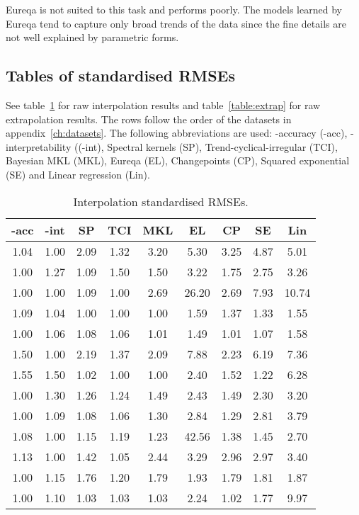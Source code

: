 Eureqa is not suited to this task and performs poorly.
The models learned by Eureqa tend to capture only broad trends of the data since the fine details are not well explained by parametric forms.

\subsection{Tables of standardised RMSEs}

See table~\ref{table:interp} for raw interpolation results and table~\ref{table:extrap} for raw extrapolation results. 
The rows follow the order of the datasets in appendix~\ref{ch:datasets}.
The following abbreviations are used: \procedurename{}-accuracy (\procedurename{}-acc), \procedurename{}-interpretability ((\procedurename{}-int), Spectral kernels (SP), Trend-cyclical-irregular (TCI), Bayesian MKL (MKL), Eureqa (EL), Changepoints (CP), Squared exponential (SE) and Linear regression (Lin).

\begin{table}[ht]
\center
\begin{tabular}{|c|c|c|c|c|c|c|c|c|}
\hline
\procedurename{}-acc & \procedurename{}-int & SP & TCI & MKL & EL & CP & SE & Lin \\
\hline
1.04 & 1.00 & 2.09 & 1.32 & 3.20 & 5.30 & 3.25 & 4.87 & 5.01\\
1.00 & 1.27 & 1.09 & 1.50 & 1.50 & 3.22 & 1.75 & 2.75 & 3.26\\
1.00 & 1.00 & 1.09 & 1.00 & 2.69 & 26.20 & 2.69 & 7.93 & 10.74\\
1.09 & 1.04 & 1.00 & 1.00 & 1.00 & 1.59 & 1.37 & 1.33 & 1.55\\
1.00 & 1.06 & 1.08 & 1.06 & 1.01 & 1.49 & 1.01 & 1.07 & 1.58\\
1.50 & 1.00 & 2.19 & 1.37 & 2.09 & 7.88 & 2.23 & 6.19 & 7.36\\
1.55 & 1.50 & 1.02 & 1.00 & 1.00 & 2.40 & 1.52 & 1.22 & 6.28\\
1.00 & 1.30 & 1.26 & 1.24 & 1.49 & 2.43 & 1.49 & 2.30 & 3.20\\
1.00 & 1.09 & 1.08 & 1.06 & 1.30 & 2.84 & 1.29 & 2.81 & 3.79\\
1.08 & 1.00 & 1.15 & 1.19 & 1.23 & 42.56 & 1.38 & 1.45 & 2.70\\
1.13 & 1.00 & 1.42 & 1.05 & 2.44 & 3.29 & 2.96 & 2.97 & 3.40\\
1.00 & 1.15 & 1.76 & 1.20 & 1.79 & 1.93 & 1.79 & 1.81 & 1.87\\
1.00 & 1.10 & 1.03 & 1.03 & 1.03 & 2.24 & 1.02 & 1.77 & 9.97\\
\hline
\end{tabular}
\caption{Interpolation standardised RMSEs.}
\label{table:interp}
\end{table}


